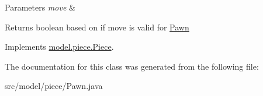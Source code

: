 \begin{DoxyParams}{Parameters}
{\em move} & \\
\hline
\end{DoxyParams}
\begin{DoxyReturn}{Returns}
boolean based on if move is valid for \hyperlink{classmodel_1_1piece_1_1_pawn}{Pawn} 
\end{DoxyReturn}


Implements \hyperlink{classmodel_1_1piece_1_1_piece_af7ce06755c9f20f3481796ca5b512849}{model.\-piece.\-Piece}.



The documentation for this class was generated from the following file\-:\begin{DoxyCompactItemize}
\item 
src/model/piece/Pawn.\-java\end{DoxyCompactItemize}
